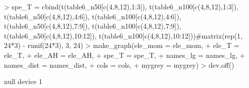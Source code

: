 \documentclass{article}
\begin{document}
\begin{Schunk}
\begin{Sinput}
> spe_T = cbind(t(table6_n50[c(4,8,12),1:3]), t(table6_n100[c(4,8,12),1:3]), t(table6_n50[c(4,8,12),4:6]), t(table6_n100[c(4,8,12),4:6]), t(table6_n50[c(4,8,12),7:9]), t(table6_n100[c(4,8,12),7:9]), t(table6_n50[c(4,8,12),10:12]), t(table6_n100[c(4,8,12),10:12]))#matrix(rep(1, 24*3) - runif(24*3), 3, 24)
> make_graph(ele_mom = ele_mom,
+            ele_T = ele_T,
+            ele_AH = ele_AH,
+            spe_T = spe_T,
+            names_lg = names_lg,
+            names_dist = names_dist,
+            cols = cols,
+            mygrey = mygrey)
> dev.off()
\end{Sinput}
\begin{Soutput}
null device 
          1 
\end{Soutput}
\end{Schunk}

\begin{figure}

\end{figure}
\end{document}
